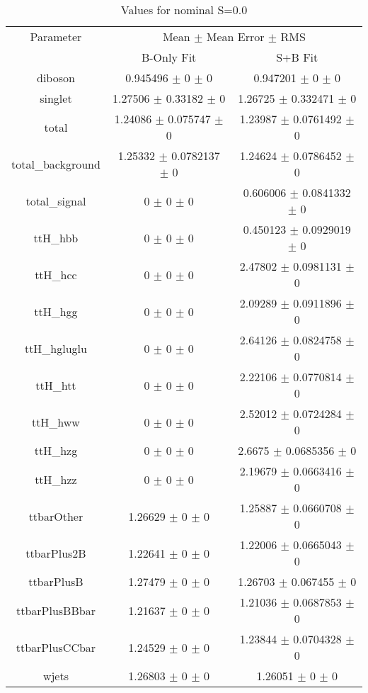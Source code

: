 \begin{table}
\centering
\caption{Values for nominal S=0.0}
\begin{tabular}{ccc}
\toprule
Parameter & \multicolumn{2}{c}{Mean $\pm$ Mean Error $\pm$ RMS}\\
 & B-Only Fit & S+B Fit\\
\midrule
diboson & \num{0.945496} $\pm$ \num{0} $\pm$ \num{0} & \num{0.947201} $\pm$ \num{0} $\pm$ \num{0}\\
singlet & \num{1.27506} $\pm$ \num{0.33182} $\pm$ \num{0} & \num{1.26725} $\pm$ \num{0.332471} $\pm$ \num{0}\\
total & \num{1.24086} $\pm$ \num{0.075747} $\pm$ \num{0} & \num{1.23987} $\pm$ \num{0.0761492} $\pm$ \num{0}\\
total\_background & \num{1.25332} $\pm$ \num{0.0782137} $\pm$ \num{0} & \num{1.24624} $\pm$ \num{0.0786452} $\pm$ \num{0}\\
total\_signal & \num{0} $\pm$ \num{0} $\pm$ \num{0} & \num{0.606006} $\pm$ \num{0.0841332} $\pm$ \num{0}\\
ttH\_hbb & \num{0} $\pm$ \num{0} $\pm$ \num{0} & \num{0.450123} $\pm$ \num{0.0929019} $\pm$ \num{0}\\
ttH\_hcc & \num{0} $\pm$ \num{0} $\pm$ \num{0} & \num{2.47802} $\pm$ \num{0.0981131} $\pm$ \num{0}\\
ttH\_hgg & \num{0} $\pm$ \num{0} $\pm$ \num{0} & \num{2.09289} $\pm$ \num{0.0911896} $\pm$ \num{0}\\
ttH\_hgluglu & \num{0} $\pm$ \num{0} $\pm$ \num{0} & \num{2.64126} $\pm$ \num{0.0824758} $\pm$ \num{0}\\
ttH\_htt & \num{0} $\pm$ \num{0} $\pm$ \num{0} & \num{2.22106} $\pm$ \num{0.0770814} $\pm$ \num{0}\\
ttH\_hww & \num{0} $\pm$ \num{0} $\pm$ \num{0} & \num{2.52012} $\pm$ \num{0.0724284} $\pm$ \num{0}\\
ttH\_hzg & \num{0} $\pm$ \num{0} $\pm$ \num{0} & \num{2.6675} $\pm$ \num{0.0685356} $\pm$ \num{0}\\
ttH\_hzz & \num{0} $\pm$ \num{0} $\pm$ \num{0} & \num{2.19679} $\pm$ \num{0.0663416} $\pm$ \num{0}\\
ttbarOther & \num{1.26629} $\pm$ \num{0} $\pm$ \num{0} & \num{1.25887} $\pm$ \num{0.0660708} $\pm$ \num{0}\\
ttbarPlus2B & \num{1.22641} $\pm$ \num{0} $\pm$ \num{0} & \num{1.22006} $\pm$ \num{0.0665043} $\pm$ \num{0}\\
ttbarPlusB & \num{1.27479} $\pm$ \num{0} $\pm$ \num{0} & \num{1.26703} $\pm$ \num{0.067455} $\pm$ \num{0}\\
ttbarPlusBBbar & \num{1.21637} $\pm$ \num{0} $\pm$ \num{0} & \num{1.21036} $\pm$ \num{0.0687853} $\pm$ \num{0}\\
ttbarPlusCCbar & \num{1.24529} $\pm$ \num{0} $\pm$ \num{0} & \num{1.23844} $\pm$ \num{0.0704328} $\pm$ \num{0}\\
wjets & \num{1.26803} $\pm$ \num{0} $\pm$ \num{0} & \num{1.26051} $\pm$ \num{0} $\pm$ \num{0}\\
\bottomrule
\end{tabular}
\end{table}